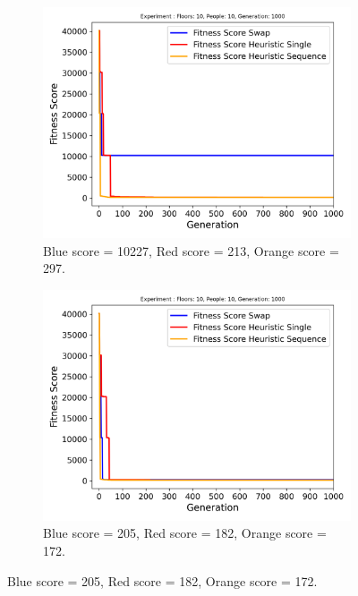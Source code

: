\begin{figure}[h]
	\centering
	\begin{subfigure}[b]{0.49\linewidth}
		\centering
		\includegraphics[width=\linewidth]{results/Building1/Mutation_0.1/Floors: 10, People: 10, Generation: 1000_worst.png}
		\caption{Blue score = 10227, Red score = 213, Orange score = 297.}
		\label{fig:Building1/Mutation_0.1/Floors: 10, People: 10, Generation: 1000_worst}
	\end{subfigure}
	\hfill
	\begin{subfigure}[b]{0.49\linewidth}
		\centering
		\includegraphics[width=\linewidth]{results/Building1/Mutation_0.1/Floors: 10, People: 10, Generation: 1000_best.png}
		\caption{Blue score = 205, Red score = 182, Orange score = 172.}
		\label{fig:Building1/Mutation_0.1/Floors: 10, People: 10, Generation: 1000_best}
	\end{subfigure}
	\hfill
	\label{fig:Building 1 results}
\end{figure}
